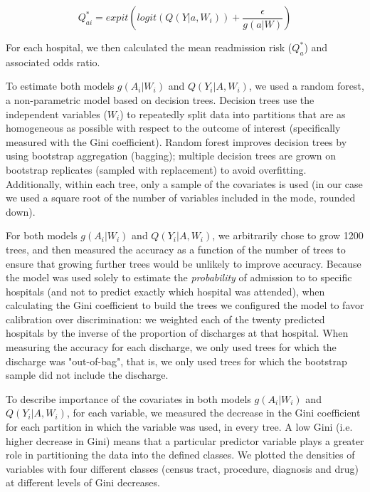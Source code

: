 \documentclass[]{article}\usepackage[]{graphicx}\usepackage[]{color}
\begin{document}
\begin{equation}
\label{Q_star_logistic}
Q^*_{ai}= expit(logit(Q(Y|a,W_i)) + \frac{\epsilon}{g(a|W)})
\end{equation}

For each hospital, we then calculated the mean readmission risk ($Q^*_a$) and associated odds ratio.

To estimate both models $g(A_i|W_i)$ and $Q(Y_i|A,W_i)$, we used a random forest, a non-parametric model based on decision trees.\supercite{breiman_random_2001} Decision trees use the independent variables ($W_i$) to repeatedly split data into partitions that are as homogeneous as possible with respect to the outcome of interest (specifically measured with the Gini coefficient\supercite{gini_variabilita_1912}). Random forest improves decision trees by using bootstrap aggregation (bagging); multiple decision trees are grown on bootstrap replicates (sampled with replacement) to avoid overfitting. Additionally, within each tree, only a sample of the covariates is used (in our case we used a square root of the number of variables included in the mode, rounded down).

For both models $g(A_i|W_i)$ and $Q(Y_i|A,W_i)$, we arbitrarily chose to grow 1200 trees, and then measured the accuracy as a function of the number of trees to ensure that growing further trees would be unlikely to improve accuracy. Because the model was used solely to estimate the \emph{probability} of admission to to specific hospitals (and not to predict exactly which hospital was attended), when calculating the Gini coefficient to build the trees we configured the model to favor calibration over discrimination: we weighted each of the twenty predicted hospitals by the inverse of the proportion of discharges at that hospital. When measuring the accuracy for each discharge, we only used trees for which the discharge was "out-of-bag", that is, we only used trees for which the bootstrap sample did not include the discharge.

To describe importance of the covariates in both models $g(A_i|W_i)$ and $Q(Y_i|A,W_i)$, for each variable, we measured the decrease in the Gini coefficient for each partition in which the variable was used, in every tree. A low Gini (i.e. higher decrease in Gini) means that a particular predictor variable plays a greater role in partitioning the data into the defined classes. We plotted the densities of variables with four different classes (census tract, procedure, diagnosis and drug) at different levels of Gini decreases.
\end{document}
